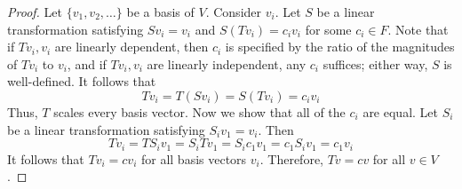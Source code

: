 \documentclass[../psets.tex]{subfiles}
\begin{document}
\begin{enumerate}[resume]
\begin{proof}


        Let $\{v_1,v_2,\dots\}$ be a basis of $V$. Consider $v_i$. Let $S$ be a linear transformation satisfying $Sv_i=v_i$ and $S(Tv_i)=c_iv_i$ for some $c_i\in F$. Note that if $Tv_i,v_i$ are linearly dependent, then $c_i$ is specified by the ratio of the magnitudes of $Tv_i$ to $v_i$, and if $Tv_i,v_i$ are linearly independent, any $c_i$ suffices; either way, $S$ is well-defined. It follows that
        \begin{equation*}
            Tv_i = T(Sv_i)
            = S(Tv_i)
            = c_iv_i
        \end{equation*}
        Thus, $T$ scales every basis vector. Now we show that all of the $c_i$ are equal. Let $S_i$ be a linear transformation satisfying $S_iv_1=v_i$. Then
        \begin{equation*}
            Tv_i = TS_iv_1
            = S_iTv_1
            = S_ic_1v_1
            = c_1S_iv_1
            = c_1v_i
        \end{equation*}
        It follows that $Tv_i=cv_i$ for all basis vectors $v_i$. Therefore, $Tv=cv$ for all $v\in V$.
    \end{proof}
\end{enumerate}
\end{document}
